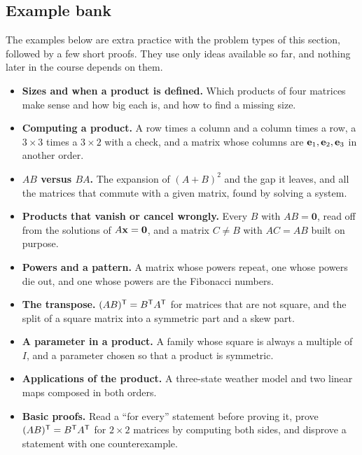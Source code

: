\documentclass[11pt]{article}
\begin{document}
\subsection*{Example bank}

The examples below are extra practice with the problem types of this section, followed by a few short proofs. They use only ideas available so far, and nothing later in the course depends on them.

\begin{remark}
\begin{itemize}
  \item \textbf{Sizes and when a product is defined.} Which products of four matrices make sense and how big each is, and how to find a missing size.
  \item \textbf{Computing a product.} A row times a column and a column times a row, a $3\times3$ times a $3\times2$ with a check, and a matrix whose columns are $\mathbf{e}_1,\mathbf{e}_2,\mathbf{e}_3$ in another order.
  \item \textbf{$AB$ versus $BA$.} The expansion of $(A+B)^2$ and the gap it leaves, and all the matrices that commute with a given matrix, found by solving a system.
  \item \textbf{Products that vanish or cancel wrongly.} Every $B$ with $AB=\mathbf{0}$, read off from the solutions of $A\mathbf{x}=\mathbf{0}$, and a matrix $C\neq B$ with $AC=AB$ built on purpose.
  \item \textbf{Powers and a pattern.} A matrix whose powers repeat, one whose powers die out, and one whose powers are the Fibonacci numbers.
  \item \textbf{The transpose.} $(AB)^{\mathsf T}=B^{\mathsf T} A^{\mathsf T}$ for matrices that are not square, and the split of a square matrix into a symmetric part and a skew part.
  \item \textbf{A parameter in a product.} A family whose square is always a multiple of $I$, and a parameter chosen so that a product is symmetric.
  \item \textbf{Applications of the product.} A three-state weather model and two linear maps composed in both orders.
  \item \textbf{Basic proofs.} Read a ``for every'' statement before proving it, prove $(AB)^{\mathsf T}=B^{\mathsf T} A^{\mathsf T}$ for $2\times2$ matrices by computing both sides, and disprove a statement with one counterexample.
\end{itemize}
\end{remark}
\end{document}
